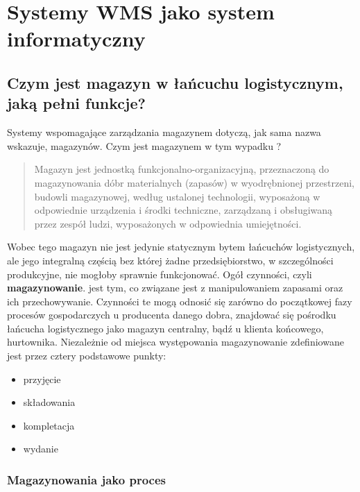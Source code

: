 \chapter{Systemy WMS jako system informatyczny}
\label{c3:c3}

\section{Czym jest magazyn w łańcuchu logistycznym, jaką pełni funkcje?}
	Systemy wspomagające zarządzania magazynem dotyczą, jak sama nazwa wskazuje, magazynów.
	Czym jest magazynem w tym wypadku ?
	\begin{quotation}
		Magazyn jest jednostką funkcjonalno-organizacyjną, przeznaczoną do magazynowania
		dóbr materialnych (zapasów) w wyodrębnionej przestrzeni, budowli magazynowej, według ustalonej
		technologii, wyposażoną w odpowiednie urządzenia i środki techniczne, zarządzaną i obsługiwaną
		przez zespół ludzi, wyposażonych w odpowiednia umiejętności.
	\end{quotation}
	
	Wobec tego magazyn nie jest jedynie statycznym bytem łańcuchów logistycznych, ale jego integralną
	częścią bez której żadne przedsiębiorstwo, w szczególności produkcyjne, nie mogłoby sprawnie
	funkcjonować. Ogół czynności, czyli \textbf{magazynowanie}. jest tym, co związane jest z manipulowaniem
	zapasami oraz ich przechowywanie. Czynności te mogą odnosić się zarówno do początkowej fazy procesów gospodarczych
	u producenta danego dobra, znajdować się pośrodku łańcucha logistycznego jako magazyn centralny, bądź u klienta
	końcowego, hurtownika. Niezależnie od miejsca występowania magazynowanie zdefiniowane jest przez cztery
	podstawowe punkty: 
	\begin{itemize}
		\item przyjęcie
		\item składowania
		\item kompletacja
		\item wydanie
	\end{itemize}
	\cite{PZMW}\cite{PL_FM}
	
	\subsection{Magazynowania jako proces}
